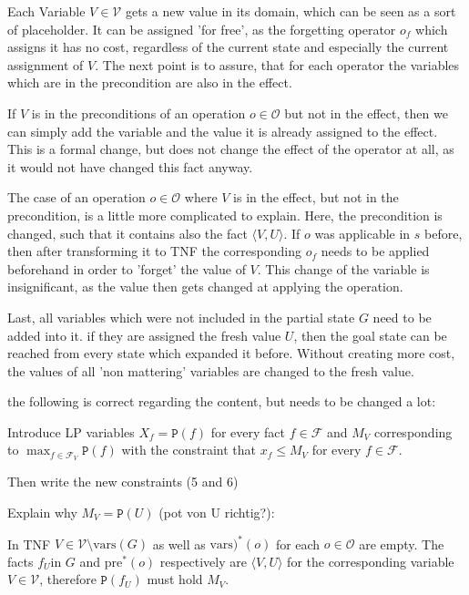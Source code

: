 Each Variable $V\in\mathcal{V}$ gets a new value in its domain, which can be seen as a sort of placeholder.
It can be assigned 'for free', as the forgetting operator $o_f$ which assigns it has no cost, regardless of the current state and especially the current assignment of $V$.
The next point is to assure, that for each operator the variables which are in the precondition are also in the effect.

If $V$ is in the preconditions of an operation $o\in\mathcal{O}$ but not in the effect, then we can simply add the variable and the value it is already assigned to the effect.
This is a formal change, but does not change the effect of the operator at all, as it would not have changed this fact anyway.

The case of an operation $o\in\mathcal{O}$ where $V$ is in the effect, but not in the precondition, is a little more complicated to explain.
Here, the precondition is changed, such that it contains also the fact $\langle V, U\rangle$.
If $o$ was applicable in $s$ before, then after transforming it to TNF the corresponding $o_f$ needs to be applied beforehand in order to 'forget' the value of $V$.
This change of the variable is insignificant, as the value then gets changed at applying the operation.

Last, all variables which were not included in the partial state $G$ need to be added into it.
if they are assigned the fresh value $U$, then the goal state can be reached from every state which expanded it before.
Without creating more cost, the values of all 'non mattering' variables are changed to the fresh value.


the following is correct regarding the content, but needs to be changed a lot:

Introduce LP variables $X_f=\mathtt{P}(f)$ for every fact $f\in\mathcal{F}$ and $M_V$ corresponding to $\max_{f\in\mathcal{F}_V}\mathtt{P}(f)$ with the constraint that $x_f\leq M_V$ for every $f\in\mathcal{F}$.

Then write the new constraints (5 and 6)

Explain why $M_V=\mathtt{P}(U)$ (pot von U richtig?):

In TNF $V\in\mathcal{V}\setminus\text{vars}(G)$ as well as $\text{vars)}^*(o)$ for each $o\in\mathcal{O}$ are empty.
The facts $f_U$in $G$ and $\text{pre}^*(o)$ respectively are $\langle V,U\rangle$ for the corresponding variable $V\in\mathcal{V}$, therefore $\mathtt{P}(f_U)$ must hold $M_V$.



